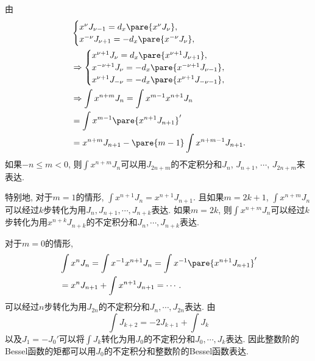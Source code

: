 \documentclass[hidelinks]{ctexart}
\begin{document}
\begin{sample}
    \begin{ex}
        由
        \begin{align*}
            & \begin{cases}
                x^\nu J_{\nu - 1} = d_x\pare{x^\nu J_\nu}, \\
                x^{-\nu}J_{\nu + 1} = -d_x \pare{x^{-\nu}J_\nu},
            \end{cases} \\
            & \Rightarrow \begin{cases}
                x^{\nu + 1}J_\nu = d_x\pare{x^{\nu + 1}J_{\nu + 1}}, \\
                x^{-\nu + 1}J_\nu = -d_x\pare{x^{-\nu + 1}J_{\nu - 1}}, \\
                x^{\nu + 1}J_{-\nu} = -d_x\pare{x^{\nu+1}J_{-\nu - 1}},
            \end{cases}\\
            & \Rightarrow \int x^{n+m}J_n = \int x^{m-1}x^{n+1}J_n \\
            & = \int x^{m-1} \pare{x^{n+1}J_{n+1}}' \\
            &= x^{n+m}J_{n+1} - \pare{m-1} \int x^{n+m-1}J_{n+1}.
        \end{align*}
        如果$-n\le m < 0$, 则$\displaystyle \int x^{n+m}J_n$可以用$J_{2n+m}$的不定积分和$J_n$, $J_{n+1}$, $\cdots$, $J_{2n+m}$来表达.
        \par
        特别地, 对于$m=1$的情形, $\displaystyle \int x^{n+1}J_n = x^{n+1}J_{n+1}$. 且如果$m=2k+1$, $\displaystyle \int x^{n+m}J_n$可以经过$k$步转化为用$J_n,J_{n+1},\cdots,J_{n+k}$表达. 如果$m=2k$, 则$\displaystyle \int x^{n+m}J_n$可以经过$k$步转化为用$x^{n+k}J_{n+k}$的不定积分和$J_n,\cdots,J_{n+k}$表达.
        \par
        对于$m=0$的情形,
        \begin{align*}
            & \int x^n J_n = \int x^{-1}x^{n+1}J_n = \int x^{-1}\pare{x^{n+1}J_{n+1}}' \\
            & = x^n J_{n+1} + \int x^{n+1}J_{n+1} = \cdots.
        \end{align*}
        可以经过$n$步转化为用$J_{2n}$的不定积分和$J_n,\cdots,J_{2n}$表达. 由
        \[ \int J_{k+2} = -2J_{k+1} + \int J_k \]
        以及$J_1 = -J_0'$可以将$\displaystyle \int J_k$转化为用$J_0$的不定积分和$J_0,\cdots,J_k$表达. 因此整数阶的Bessel函数的矩都可以用$J_0$的不定积分和整数阶的Bessel函数表达.
    \end{ex}
\end{sample}
\end{document}
